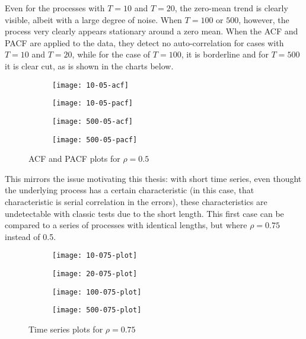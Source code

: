 Even for the processes with $T = 10$ and $T = 20$, the zero-mean trend is clearly visible, albeit with a large degree of noise. When $T = 100$ or $500$, however, the process very clearly appears stationary around a zero mean. When the ACF and PACF are applied to the data, they detect no auto-correlation for cases with $T = 10$ and $T = 20$, while for the case of $T = 100$, it is borderline and for $T = 500$ it is clear cut, as is shown in the charts below.

\begin{figure}[htp]
	\centering
	\begin{subfigure}{0.23\textwidth}
		\centering
		\texttt{[image: 10-05-acf]}
	\end{subfigure}
	\begin{subfigure}{0.23\textwidth}
		\centering
		\texttt{[image: 10-05-pacf]}
	\end{subfigure}
	\begin{subfigure}{0.23\textwidth}
		\centering
		\texttt{[image: 500-05-acf]}
	\end{subfigure}
	\begin{subfigure}{0.23\textwidth}
		\centering
		\texttt{[image: 500-05-pacf]}
	\end{subfigure}
	\caption{ACF and PACF plots for $\rho = 0.5$}
\end{figure}


This mirrors the issue motivating this thesis: with short time series, even thought the underlying process has a certain characteristic (in this case, that characteristic is serial correlation in the errors), these characteristics are undetectable with classic tests due to the short length. This first case can be compared to a series of processes with identical lengths, but where $\rho = 0.75$ instead of 0.5. 

\begin{figure}[htp]
	\centering
	\begin{subfigure}{0.23\textwidth}
		\centering
		\texttt{[image: 10-075-plot]}
	\end{subfigure}
	\begin{subfigure}{0.23\textwidth}
		\centering
		\texttt{[image: 20-075-plot]}
	\end{subfigure}
	\begin{subfigure}{0.23\textwidth}
		\centering
		\texttt{[image: 100-075-plot]}
	\end{subfigure}
	\begin{subfigure}{0.23\textwidth}
		\centering
		\texttt{[image: 500-075-plot]}
	\end{subfigure}
\caption{Time series plots for $\rho = 0.75$}
\end{figure}



